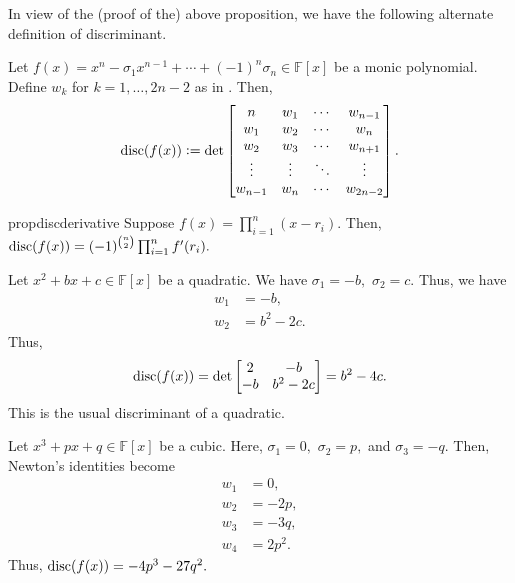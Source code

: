 In view of the (proof of the) above proposition, we have the following alternate definition of discriminant.

\begin{defn}%
    Let $f(x) = x^n - \sigma_1x^{n - 1} + \cdots + (-1)^n\sigma_n \in \mathbb{F}[x]$ be a monic polynomial. Define $w_k$ for $k = 1, \ldots, 2n - 2$ as in . Then, 
    \begin{equation*} 
        \operatorname{disc}(f(x)) \vcentcolon= \det \begin{bmatrix}
            n & w_1 & \cdots & w_{n - 1}\\
            w_1 & w_2 & \cdots & w_n\\
            w_2 & w_3 & \cdots & w_{n + 1}\\
            \vdots & \vdots & \ddots & \vdots \\
            w_{n - 1} & w_n & \cdots & w_{2n - 2}\\
        \end{bmatrix}.
    \end{equation*}
\end{defn}

\begin{restatable}{prop}{discderivative}
\label{prop:discderivative}
    Suppose $f(x) = \prod_{i = 1}^{n}(x - r_i).$ Then, $\operatorname{disc}(f(x)) = (-1)^{\binom{n}{2}}\prod_{i = 1}^{n}f'(r_i).$ \hfill\hyperref[prop:discderivative2]{\downsym}
\end{restatable}

\begin{ex}
    Let $x^2 + bx + c \in \mathbb{F}[x]$ be a quadratic. We have $\sigma_1 = -b,$ $\sigma_2 = c.$ Thus, we have
    \begin{align*} 
        w_1 &= -b,\\
        w_2 &= b^2 - 2c.
    \end{align*}
    Thus,
    \begin{equation*} 
        \operatorname{disc}(f(x)) = \det\begin{bmatrix}
            2 & -b\\
            -b & b^2 - 2c
        \end{bmatrix} = b^2 - 4c.
    \end{equation*}
    This is the usual discriminant of a quadratic.
\end{ex}

\begin{ex}
    Let $x^3 + px + q \in \mathbb{F}[x]$ be a cubic. Here, $\sigma_1 = 0,$ $\sigma_2 = p,$ and $\sigma_3 = -q.$ Then, Newton's identities become
    \begin{align*} 
        w_1 &= 0,\\
        w_2 &= -2p,\\
        w_3 &= -3q,\\
        w_4 &= 2p^2.
    \end{align*}
    Thus, $\operatorname{disc}(f(x)) = -4p^3 - 27q^2.$
\end{ex}


